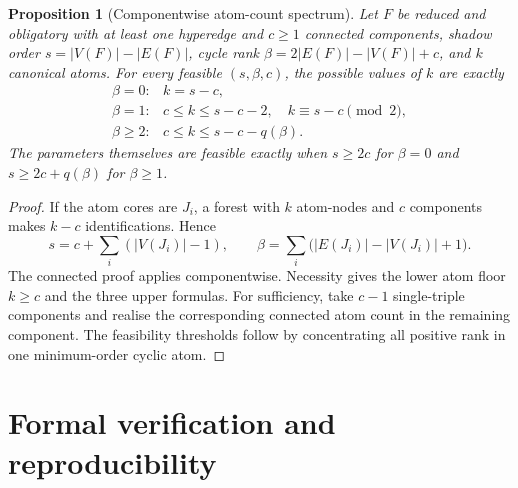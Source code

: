 \documentclass[a4paper,11pt,reqno]{amsart}
\theoremstyle{plain}
\newtheorem{proposition}[theorem]{Proposition}
\theoremstyle{definition}
\theoremstyle{remark}
\begin{document}
\begin{proposition}[Componentwise atom-count spectrum]
\label{proposition-componentwise-atom-count-spectrum}
Let $F$ be reduced and obligatory with at least one hyperedge and $c\ge1$
connected components, shadow order
$s=|V(F)|-|E(F)|$, cycle rank
$\beta=2|E(F)|-|V(F)|+c$, and $k$ canonical atoms.  For every feasible
$(s,\beta,c)$, the possible values of $k$ are exactly
\[
\begin{array}{ll}
\beta=0:
  & k=s-c,\\[1mm]
\beta=1:
  & c\le k\le s-c-2,\quad k\equiv s-c\pmod2,\\[1mm]
\beta\ge2:
  & c\le k\le s-c-q(\beta).
\end{array}
\tag{10.20}
\]
The parameters themselves are feasible exactly when $s\ge2c$ for $\beta=0$
and $s\ge2c+q(\beta)$ for $\beta\ge1$.
\end{proposition}
\begin{proof}
If the atom cores are $J_i$, a forest with $k$ atom-nodes and $c$ components
makes $k-c$ identifications.  Hence
\[
s=c+\sum_i(|V(J_i)|-1),
\qquad
\beta=\sum_i\bigl(|E(J_i)|-|V(J_i)|+1\bigr).
\]
The connected proof applies componentwise.  Necessity gives the lower atom
floor $k\ge c$ and the three upper formulas.  For sufficiency, take $c-1$
single-triple components and realise the corresponding connected atom count
in the remaining component.  The feasibility thresholds follow by
concentrating all positive rank in one minimum-order cyclic atom.
\end{proof}

\section*{Formal verification and reproducibility}
\end{document}
